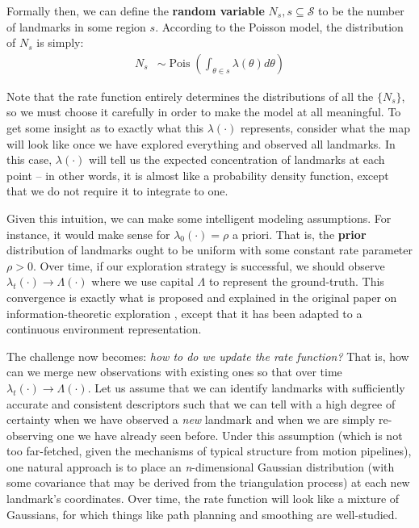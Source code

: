 \documentclass[12pt]{article}
\DeclareMathOperator{\Pois}{Pois}
\begin{document}
Formally then, we can define the \textbf{random variable} $N_s, s \subseteq \mathcal{S}$ to be the number of landmarks in some region $s$. According to the Poisson model, the distribution of $N_s$ is simply:
\begin{align}
  N_s &\sim
  \Pois \left( \int_{\theta \in s} \lambda(\theta) d\theta \right)
\end{align}

Note that the rate function entirely determines the distributions of all the $\{N_s\}$, so we must choose it carefully in order to make the model at all meaningful. To get some insight as to exactly what this $\lambda(\cdot)$ represents, consider what the map will look like once we have explored everything and observed all landmarks. In this case, $\lambda(\cdot)$ will tell us the expected concentration of landmarks at each point -- in other words, it is almost like a probability density function, except that we do not require it to integrate to one.

Given this intuition, we can make some intelligent modeling assumptions. For instance, it would make sense for $\lambda_0(\cdot) = \rho$ a priori. That is, the \textbf{prior} distribution of landmarks ought to be uniform with some constant rate parameter $\rho > 0$. Over time, if our exploration strategy is successful, we should observe $\lambda_t(\cdot) \rightarrow \Lambda(\cdot)$ where we use capital $\Lambda$ to represent the ground-truth. This convergence is exactly what is proposed and explained in the original paper on information-theoretic exploration \cite{bourgault}, except that it has been adapted to a continuous environment representation.

The challenge now becomes: \textit{how to do we update the rate function?} That is, how can we merge new observations with existing ones so that over time $\lambda_t(\cdot) \rightarrow \Lambda(\cdot)$. Let us assume that we can identify landmarks with sufficiently accurate and consistent descriptors such that we can tell with a high degree of certainty when we have observed a \textit{new} landmark and when we are simply re-observing one we have already seen before. Under this assumption (which is not too far-fetched, given the mechanisms of typical structure from motion pipelines), one natural approach is to place an \textit{n}-dimensional Gaussian distribution (with some covariance that may be derived from the triangulation process) at each new landmark's coordinates. Over time, the rate function will look like a mixture of Gaussians, for which things like path planning and smoothing are well-studied.
\end{document}
